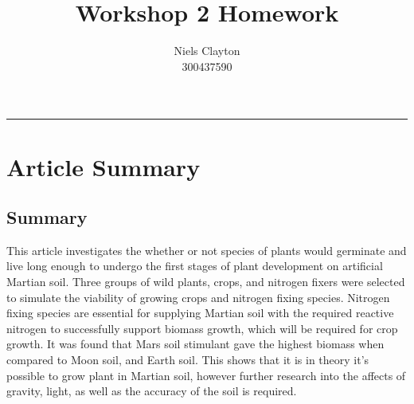 \documentclass[a4paper,11pt]{article}
\begin{document}
\title{\LARGE{\textbf{Workshop 2 Homework}}}
\author{Niels Clayton \\300437590}
\maketitle
\hrule

\section{\LARGE{Article Summary}}
\subsection{Summary}
\linenumbers
This article investigates the whether or not species of plants would germinate and live long enough to undergo the first stages of plant development on artificial Martian soil. Three groups of wild plants, crops, and nitrogen fixers were selected to simulate  the viability of growing crops and nitrogen fixing species. Nitrogen fixing species are essential for supplying Martian soil with the required reactive nitrogen to successfully support biomass growth, which will be required for crop growth. It was found that Mars soil stimulant gave the highest biomass when compared to Moon soil, and Earth soil. This shows that it is in theory it's possible to grow plant in Martian  soil, however further research into the affects of gravity, light, as well as the accuracy of the soil is required.
\end{document}
